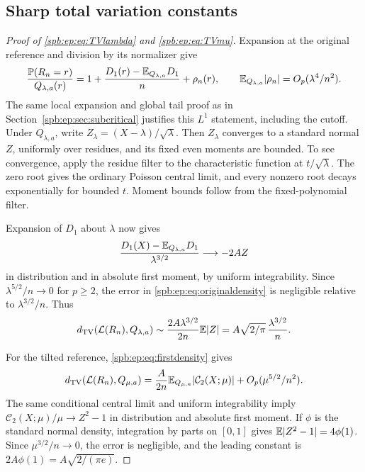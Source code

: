 \subsection{Sharp total variation constants}
\begin{proof}[Proof of \eqref{spb:ep:eq:TVlambda} and \eqref{spb:ep:eq:TVmu}]
Expansion at the original reference and division by its normalizer give
\begin{equation}\label{spb:ep:eq:originaldensity}
 \frac{\mathbb P(R_n=r)}{Q_{\lambda,a}(r)}
 =1+\frac{D_1(r)-\mathbb E_{Q_{\lambda,a}}D_1}{n}+\rho_n(r),
 \qquad \mathbb E_{Q_{\lambda,a}}|\rho_n|=O_p(\lambda^4/n^2).
\end{equation}
The same local expansion and global tail proof as in Section~\ref{spb:ep:sec:subcritical}
justifies this $L^1$ statement, including the cutoff.
Under $Q_{\lambda,a}$, write $Z_\lambda=(X-\lambda)/\sqrt\lambda$.
Then $Z_\lambda$ converges to a standard normal $Z$, uniformly over residues,
and its fixed even moments are bounded.
To see convergence, apply the residue filter to the characteristic function
at $t/\sqrt\lambda$. The zero root gives the ordinary Poisson central
limit, and every nonzero root decays exponentially for bounded $t$.
Moment bounds follow from the fixed-polynomial filter.

Expansion of $D_1$ about $\lambda$ now gives
\[
 \frac{D_1(X)-\mathbb E_{Q_{\lambda,a}}D_1}{\lambda^{3/2}}
                    \longrightarrow -2AZ
\]
in distribution and in absolute first moment, by uniform integrability.
Since $\lambda^{5/2}/n\to0$ for $p\ge2$, the error in
\eqref{spb:ep:eq:originaldensity} is negligible relative to
$\lambda^{3/2}/n$. Thus
\[
 d_{\mathrm{TV}}(\mathcal L(R_n),Q_{\lambda,a})
     \sim\frac{2A\lambda^{3/2}}{2n}\mathbb E|Z|
     =A\sqrt{2/\pi}\,\frac{\lambda^{3/2}}n.
\]

For the tilted reference, \eqref{spb:ep:eq:firstdensity} gives
\[
 d_{\mathrm{TV}}(\mathcal L(R_n),Q_{\mu,a})
 =\frac{A}{2n}\mathbb E_{Q_{\mu,a}}|\mathcal C_2(X;\mu)|
                                    +O_p(\mu^{5/2}/n^2).
\]
The same conditional central limit and uniform integrability imply
$\mathcal C_2(X;\mu)/\mu\to Z^2-1$ in distribution and absolute first
moment. If $\phi$ is the standard normal density, integration by parts
on $[0,1]$ gives $\mathbb E|Z^2-1|=4\phi(1)$.
Since $\mu^{3/2}/n\to0$, the error is negligible, and the leading constant is
$2A\phi(1)=A\sqrt{2/(\pi e)}$.
\end{proof}

